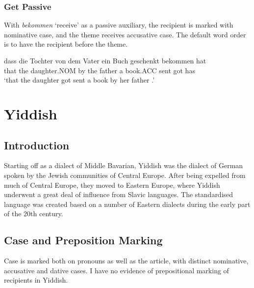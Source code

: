 \subsubsection{Get Passive}
With \emph{bekommen} `receive' as a passive auxiliary, the recipient is marked with nominative case, and the theme receives accusative case. The default word order is to have the recipient before the theme.
\begin{exe}
\ex dass die Tochter von dem Vater ein Buch geschenkt bekommen hat\\
that the daughter.NOM by the father a book.ACC sent got has\\
\trans `that the daughter got sent a book by her father \cite[183]{Draye.1996}.'
\end{exe}

\section{Yiddish}\label{sec:Yiddish}
\subsection{Introduction}
Starting off as a dialect of Middle Bavarian, Yiddish was the dialect of German spoken by the Jewish communities of Central Europe. After being expelled from much of Central Europe, they moved to Eastern Europe, where Yiddish underwent a great deal of influence from Slavic languages. The standardised language was created based on a number of Eastern dialects during the early part of the 20th century.
\subsection{Case and Preposition Marking}
Case is marked both on pronouns as well as the article, with distinct nominative, accusative and dative cases. I have no evidence of prepositional marking of recipients in Yiddish.
